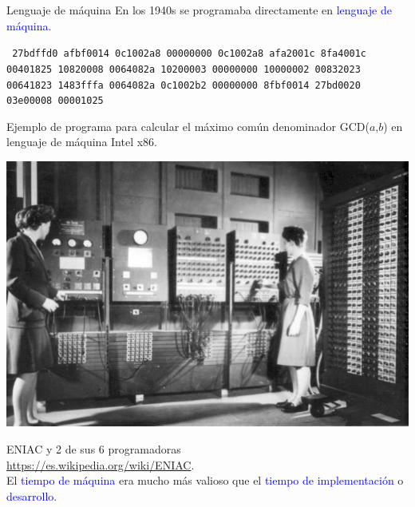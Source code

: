 \documentclass{beamer} %
\newcommand{\blue}[1]{\textcolor{blue}{#1}}
\begin{document}
\begin{frame}{Lenguaje de máquina}
    En los 1940s se programaba directamente en \blue{lenguaje de máquina}.
    \medskip
    
    \scriptsize{\texttt{\hspace{2ex} 27bdffd0 afbf0014 0c1002a8 00000000 0c1002a8 afa2001c 8fa4001c\\
    \hspace{2ex} 00401825 10820008 0064082a 10200003 00000000 10000002 00832023\\
    \hspace{2ex} 00641823 1483fffa 0064082a 0c1002b2 00000000 8fbf0014 27bd0020\\
    \hspace{2ex} 03e00008 00001025}}
    \medskip

    \scriptsize{Ejemplo de programa para calcular el máximo común denominador GCD($a$,$b$) en lenguaje de máquina Intel x86.}
    \medskip
    
    \pause
    \begin{minipage}{0.47\textwidth}
    \includegraphics[width=.95\textwidth]{./image/cap1/ENIAC}
    \end{minipage}
    \begin{minipage}{0.52\textwidth}
      \scriptsize{ENIAC y 2 de sus 6 programadoras\\
      \url{https://es.wikipedia.org/wiki/ENIAC}.\\\pause
      El \blue{tiempo de máquina} era mucho más valioso que el \blue{tiempo de implementación} o \blue{desarrollo}.}
    \end{minipage}
\end{frame}
\end{document}
